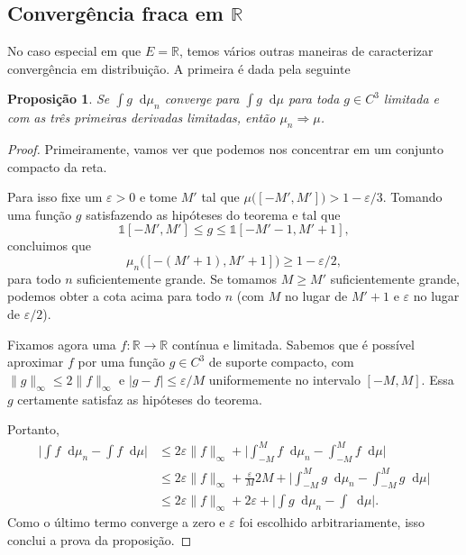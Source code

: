 \documentclass[reqno, final]{book}
\newcommand*\1{\mathds{1}}
\newtheorem{proposition}[theorem]{Proposição}
\renewcommand*\d{\mathop{}\!\mathrm{d}}
\begin{document}
\subsection{Convergência fraca em \texorpdfstring{$\mathbb{R}$}{R}}

No caso especial em que $E = \mathbb{R}$, temos vários outras maneiras de caracterizar convergência em distribuição.
A primeira é dada pela seguinte

\begin{proposition}
  \label{p:conv_distr_suave}
  Se $\int g \d \mu_n$ converge para $\int g \d \mu$ para toda $g \in C^3$ limitada e com as três primeiras derivadas limitadas, então $\mu_n \Rightarrow \mu$.
\end{proposition}

\begin{proof}
  Primeiramente, vamos ver que podemos nos concentrar em um conjunto compacto da reta.

  Para isso fixe um $\varepsilon > 0$ e tome $M'$ tal que $\mu\big( [-M', M'] \big) > 1 - \varepsilon / 3$.
  Tomando uma função $g$ satisfazendo as hipóteses do teorema e tal que
  \begin{equation}
    \1{[-M',M']} \leq g \leq \1{[-M'-1,M'+1]},
  \end{equation}
  concluimos que
  \begin{equation}
    \mu_n \big( [-(M'+1), M'+1] \big) \geq 1 - \varepsilon/2,
  \end{equation}
  para todo $n$ suficientemente grande.
  Se tomamos $M \geq M'$ suficientemente grande, podemos obter a cota acima para todo $n$ (com $M$ no lugar de $M'+1$ e $\varepsilon$ no lugar de $\varepsilon/2$).

  Fixamos agora uma $f: \mathbb{R} \to \mathbb{R}$ contínua e limitada.
  Sabemos que é possível aproximar $f$ por uma função $g \in C^3$ de suporte compacto, com $\lVert g \rVert_\infty \leq 2 \lVert f \rVert_\infty$ e $|g - f| \leq \varepsilon/M$ uniformemente no intervalo $[-M,M]$.
  Essa $g$ certamente satisfaz as hipóteses do teorema.

  Portanto,
  \begin{equation*}
    \begin{split}
      \Big| \int f \d \mu_n - \int f \d \mu\Big| & \leq 2 \varepsilon \lVert f \rVert_\infty + \Big| \int_{-M}^M f \d \mu_n - \int_{-M}^M f \d \mu\Big|\\
      & \leq 2 \varepsilon \lVert f \rVert_\infty + \frac \varepsilon{M} 2 M + \Big| \int_{-M}^M g \d \mu_n - \int_{-M}^M g \d \mu\Big|\\
      & \leq 2 \varepsilon \lVert f \rVert_\infty + 2 \varepsilon + \Big| \int g \d \mu_n - \int \d \mu\Big|.
    \end{split}
  \end{equation*}
  Como o último termo converge a zero e $\varepsilon$ foi escolhido arbitrariamente, isso conclui a prova da proposição.
\end{proof}
\end{document}
